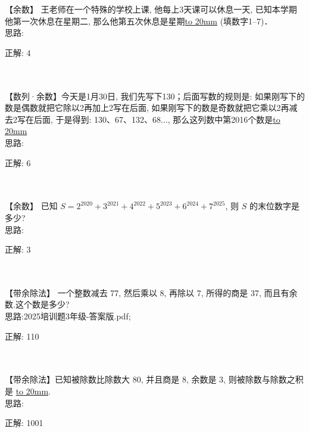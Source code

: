 \item {
    【余数】
    王老师在一个特殊的学校上课, 他每上3天课可以休息一天, 已知本学期他第一次休息在星期二, 那么他第五次休息是星期\underline{\hbox to 20mm{}} (填数字1--7)．
    \ifshowSolution
        \fangsong{}
        \\
        思路:

        正解: 4
    \else
        \\ \\ \\
    \fi
}

\item {
    【数列·余数】今天是1月30日, 我们先写下130；后面写数的规则是: 如果刚写下的数是偶数就把它除以2再加上2写在后面, 如果刚写下的数是奇数就把它乘以2再减去2写在后面, 于是得到: 130、67、132、68..., 那么这列数中第2016个数是\underline{\hbox to 20mm{}}
    \ifshowSolution
        \fangsong{}
        \\
        思路:

        正解:  6
    \else
        \\ \\ \\
    \fi
}

\item {
    【余数】
    已知 $S = 2^{2020} + 3^{2021} + 4^{2022} + 5^{2023} +6^{2024} + 7^{2025}$, 则 $S$ 的末位数字是多少? 
    \ifshowSolution
        \fangsong{}
        \\
        思路:

        正解: 3
    \else
        \\ \\ \\
    \fi
}

\item {
    【带余除法】
    一个整数减去 77, 然后乘以 8, 再除以 7, 所得的商是 37, 而且有余数.这个数是多少? 
    \ifshowSolution
        \fangsong{}
        \\
        思路:2025培训题3年级-答案版.pdf;

        正解:  110
    \else
        \\ \\ \\
    \fi
}

\item {
    【带余除法】已知被除数比除数大 80, 并且商是 8, 余数是 3, 则被除数与除数之积是 \underline{\hbox to 20mm{}}.
    \ifshowSolution
        \fangsong{}
        \\
        思路:

        正解: 1001
    \else
        \\ \\ \\
    \fi
}

